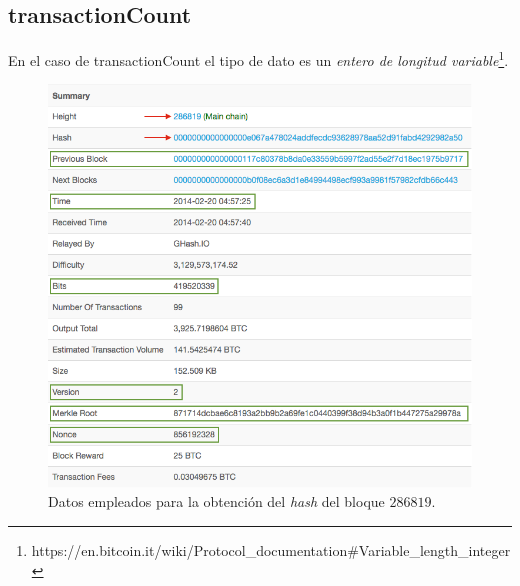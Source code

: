 \documentclass{article}
\begin{document}
    \subsection{transactionCount}
    En el caso de transactionCount el tipo de dato es un \textit{entero de longitud variable}\footnote{https://en.bitcoin.it/wiki/Protocol\_documentation\#Variable\_length\_integer}.
    
    \begin{figure}[H]
    \centering
        \includegraphics[scale=0.47]{img/Bitcoin_block_SHA_256_Block_Data}
        \caption{Datos empleados para la obtención del \textit{hash} del bloque $286819$.}
    \end{figure}
    
\end{document}
